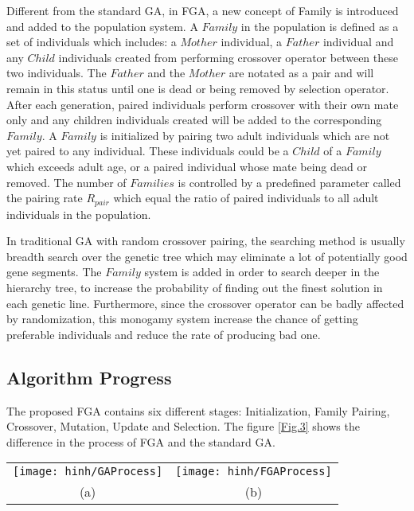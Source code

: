 \documentclass[final]{elsarticle}
\begin{document}
Different from the standard GA, in FGA, a new concept of Family is introduced and added to the population system. A $ Family $ in the population is defined as a set of individuals which includes: a $ Mother $ individual, a $ Father $ individual and any $ Child $ individuals created from performing crossover operator between these two individuals. The $ Father $ and the $ Mother $ are notated as a pair and will remain in this status until one is dead or being removed by selection operator. After each generation, paired individuals perform crossover with their own mate only and any children individuals created will be added to the corresponding $ Family $. A $ Family $ is initialized by pairing two adult individuals which are not yet paired to any individual. These individuals could be a $ Child $ of a $ Family $ which exceeds adult age, or a paired individual whose mate being dead or removed. The number of $ Families $ is controlled by a predefined parameter called the pairing rate $R_{pair}$ which equal the ratio of paired individuals to all adult individuals in the population.

In traditional GA with random crossover pairing, the searching method is usually breadth search over the genetic tree which may eliminate a lot of potentially good gene segments. The $ Family $ system is added in order to search deeper in the hierarchy tree, to increase the probability of finding out the finest solution in each genetic line. Furthermore, since the crossover operator can be badly affected by randomization, this monogamy system increase the chance of getting preferable individuals and reduce the rate of producing bad one. 


\subsection{Algorithm Progress}

The proposed FGA contains six different stages: Initialization, Family Pairing, Crossover, Mutation, Update and Selection. The figure \ref{Fig.3} shows the difference in the process of FGA and the standard GA.
\begin{figure*}[h]
	\begin{tabular}{cc}
		\texttt{[image: hinh/GAProcess]}&\texttt{[image: hinh/FGAProcess]}\\
		(a)  &(b) \\
	\end{tabular}
	\centering
	\caption{The algorithm process of GA (a) and FGA (b)
	}
	\label{Fig.3}       %
\end{figure*}
\end{document}
